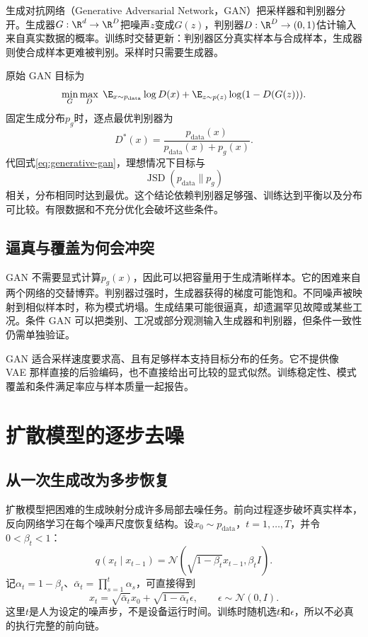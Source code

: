 生成对抗网络（Generative Adversarial Network，GAN）把采样器和判别器分开。生成器$G:\R^d\to\R^D$把噪声$z$变成$G(z)$，判别器$D:\R^D\to(0,1)$估计输入来自真实数据的概率。训练时交替更新：判别器区分真实样本与合成样本，生成器则使合成样本更难被判别。采样时只需要生成器。

原始 GAN 目标为
\begin{equation}
\min_G\max_D\;\E_{x\sim p_{\mathrm{data}}}\log D(x)+\E_{z\sim p(z)}\log(1-D(G(z))).
\label{eq:generative-gan}
\end{equation}
固定生成分布$p_g$时，逐点最优判别器为
\[
D^*(x)=\frac{p_{\mathrm{data}}(x)}{p_{\mathrm{data}}(x)+p_g(x)}.
\]
代回式\eqref{eq:generative-gan}，理想情况下目标与
\[
\operatorname{JSD}(p_{\mathrm{data}}\|p_g)
\]
相关，分布相同时达到最优。这个结论依赖判别器足够强、训练达到平衡以及分布可比较。有限数据和不充分优化会破坏这些条件。

\subsection{逼真与覆盖为何会冲突}

GAN 不需要显式计算$p_g(x)$，因此可以把容量用于生成清晰样本。它的困难来自两个网络的交替博弈。判别器过强时，生成器获得的梯度可能饱和。不同噪声被映射到相似样本时，称为模式坍塌。生成结果可能很逼真，却遗漏罕见故障或某些工况。条件 GAN 可以把类别、工况或部分观测输入生成器和判别器，但条件一致性仍需单独验证。

GAN 适合采样速度要求高、且有足够样本支持目标分布的任务。它不提供像 VAE 那样直接的后验编码，也不直接给出可比较的显式似然。训练稳定性、模式覆盖和条件满足率应与样本质量一起报告。

\section{扩散模型的逐步去噪}

\subsection{从一次生成改为多步恢复}

扩散模型把困难的生成映射分成许多局部去噪任务。前向过程逐步破坏真实样本，反向网络学习在每个噪声尺度恢复结构。设$x_0\sim p_{\mathrm{data}}$，$t=1,\ldots,T$，并令$0<\beta_t<1$：
\begin{equation}
q(x_t\mid x_{t-1})=\mathcal N(\sqrt{1-\beta_t}x_{t-1},\beta_tI).
\end{equation}
记$\alpha_t=1-\beta_t$、$\bar\alpha_t=\prod_{s=1}^t\alpha_s$，可直接得到
\begin{equation}
x_t=\sqrt{\bar\alpha_t}x_0+\sqrt{1-\bar\alpha_t}\epsilon,
\qquad \epsilon\sim\mathcal N(0,I).
\label{eq:generative-direct-noising}
\end{equation}
这里$t$是人为设定的噪声步，不是设备运行时间。训练时随机选$t$和$\epsilon$，所以不必真的执行完整的前向链。

